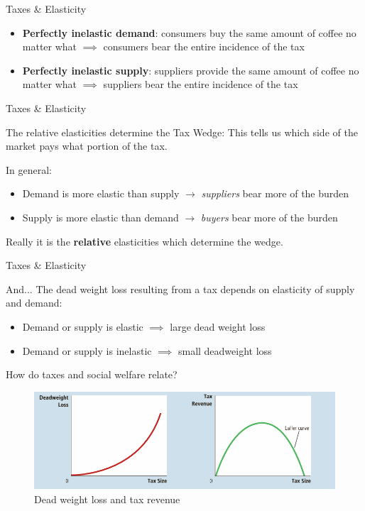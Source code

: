 \documentclass[compress]{beamer}
\begin{document}
\begin{frame}{Taxes \& Elasticity}
\begin{itemize}
    \item \textbf{Perfectly inelastic demand}: consumers buy the same amount of coffee no matter what $\implies$ consumers bear the entire incidence of the tax
    \item \textbf{Perfectly inelastic supply}: suppliers provide the same amount of coffee no matter what $\implies$ suppliers bear the entire incidence of the tax
\end{itemize}

\end{frame}


\begin{frame}{Taxes \& Elasticity}
   \begin{block}{ The relative elasticities determine the Tax Wedge: }
       This tells us which side of the market pays what portion of the tax.

       \medskip

       In general:
       \begin{itemize}
           \item Demand is more elastic than supply $\to$ \textit{suppliers} bear more of the burden
           \item Supply is more elastic than demand $\to$ \textit{buyers} bear more of the burden
       \end{itemize}
   \end{block}

   Really it is the \textbf{relative} elasticities which determine the wedge.
\end{frame}

\begin{frame}{Taxes \& Elasticity}
    \begin{block}{And... }
        The dead weight loss resulting from a tax depends on elasticity of supply and demand:
        \begin{itemize}
            \item Demand or supply is elastic $\implies$ large dead weight loss
            \item Demand or supply is inelastic $\implies$ small deadweight loss
        \end{itemize}
    \end{block}
\end{frame}

\begin{frame}{How do taxes and social welfare relate?}
    \begin{figure}
        \centering
        \includegraphics[width=0.95\linewidth]{laffer_dwl.png}
        \caption{Dead weight loss and tax revenue}
        \label{fig:placeholder}
    \end{figure}
\end{frame}
\end{document}
